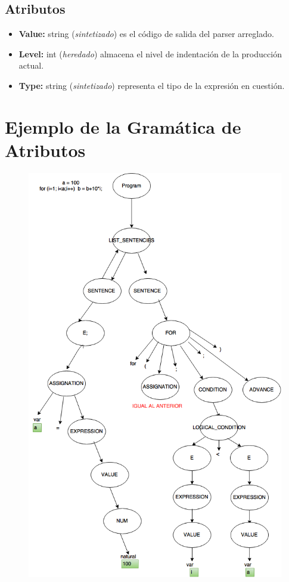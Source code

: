 \documentclass[10pt,a4paper]{article}
\begin{document}
\subsection{Atributos}

\begin{itemize}
\item \textbf{Value:} string (\textit{sintetizado}) es el código de salida del parser arreglado.
\item \textbf{Level:} int (\textit{heredado}) almacena el nivel de indentación de la producción actual.
\item \textbf{Type:} string (\textit{sintetizado}) representa el tipo de la expresión en cuestión.
\end{itemize}

\section{Ejemplo de la Gramática de Atributos}

\begin{figure}[H]
\begin{center}
\includegraphics[scale=0.7]{imgs/ejemploGramatica.png}
\end{center}
\end{figure}
\end{document}
